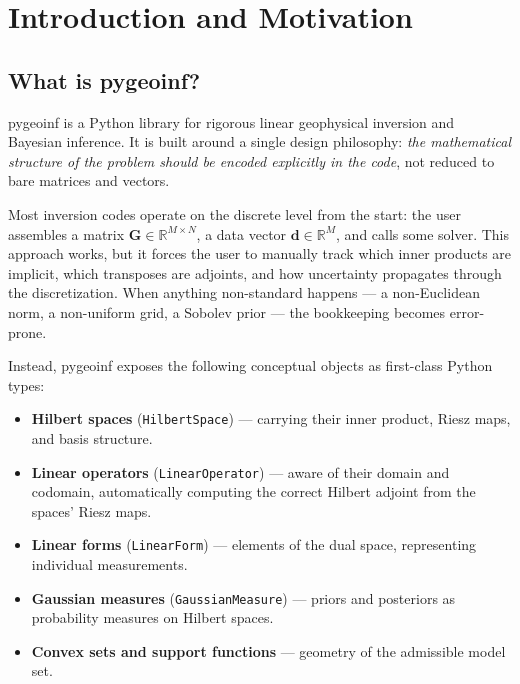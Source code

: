 \documentclass[11pt,twoside,openright]{book}
\theoremstyle{plain}
\theoremstyle{definition}
\theoremstyle{remark}
\begin{document}
\chapter{Introduction and Motivation}
\label{ch:introduction}

\section{What is pygeoinf?}
\label{sec:what-is-pygeoinf}

pygeoinf is a Python library for rigorous linear geophysical inversion and
Bayesian inference. It is built around a single design philosophy:
\emph{the mathematical structure of the problem should be encoded explicitly
in the code}, not reduced to bare matrices and vectors.

Most inversion codes operate on the discrete level from the start: the
user assembles a matrix $\mathbf{G}\in\mathbb{R}^{M\times N}$, a data
vector $\mathbf{d}\in\mathbb{R}^M$, and calls some solver. This approach
works, but it forces the user to manually track which inner products
are implicit, which transposes are adjoints, and how uncertainty
propagates through the discretization. When anything non-standard
happens --- a non-Euclidean norm, a non-uniform grid, a Sobolev
prior --- the bookkeeping becomes error-prone.

Instead, pygeoinf exposes the following conceptual objects as first-class
Python types:

\begin{itemize}
  \item \textbf{Hilbert spaces} (\texttt{HilbertSpace}) --- carrying their
    inner product, Riesz maps, and basis structure.
  \item \textbf{Linear operators} (\texttt{LinearOperator}) --- aware of
    their domain and codomain, automatically computing the correct Hilbert
    adjoint from the spaces' Riesz maps.
  \item \textbf{Linear forms} (\texttt{LinearForm}) --- elements of the dual
    space, representing individual measurements.
  \item \textbf{Gaussian measures} (\texttt{GaussianMeasure}) --- priors and
    posteriors as probability measures on Hilbert spaces.
  \item \textbf{Convex sets and support functions} --- geometry of the
    admissible model set.
\end{itemize}
\end{document}
